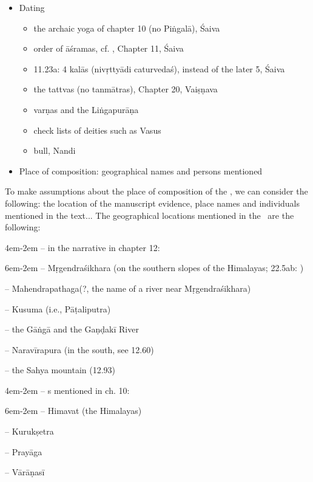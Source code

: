 \documentclass[11pt]{book}
\begin{document}
\begin{itemize}

\item
  Dating

  \begin{itemize}
  
  \item
    the archaic yoga of chapter 10 (no Piṅgalā), Śaiva
  \item
    order of āśramas, cf. , Chapter 11, Śaiva
  \item
    11.23a: 4 kalās (nivṛttyādi caturvedaś), instead of the later 5,
    Śaiva
  \item
    the tattvas (no tanmātras), Chapter 20, Vaiṣṇava
  \item
    varṇas and the Liṅgapurāṇa
  \item
    check lists of deities such as Vasus
  \item
bull, Nandi
  \end{itemize}
\item
  Place of composition: geographical names and persons mentioned
\end{itemize}

To make assumptions about the place of composition of the \Vss,
we can consider the following: the location of the manuscript 
evidence, place names and individuals mentioned in the text... 
The geographical locations 
mentioned in the \Vss\ are the following:

\leftskip4em\parindent-2em
-- in the narrative in chapter 12:

\leftskip6em\parindent-2em
-- Mṛgendraśikhara (on the southern slopes of
					the Himalayas; 22.5ab: 
		 			)
		 			
-- Mahendrapathaga(?, the name of a river near Mṛgendraśikhara)

-- Kusuma (i.e., Pāṭaliputra)

-- the Gāṅgā and the Gaṇḍakī River

-- Naravīrapura (in the south, see 12.60)

-- the Sahya mountain (12.93)

\leftskip4em\parindent-2em
-- s mentioned in ch. 10:

\leftskip6em\parindent-2em
    -- Himavat (the Himalayas)
    
	-- Kurukṣetra
	
	-- Prayāga
	
	-- Vārāṇasī
 	
\end{document}
